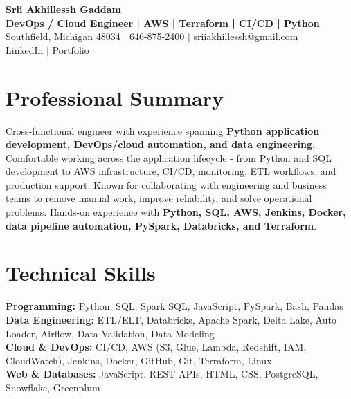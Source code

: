 \documentclass[letterpaper,10pt]{article}
\begin{document}
\fontsize{9.35pt}{10.45pt}\selectfont

\begin{center}
    {\LARGE \textbf{Srii Akhillessh Gaddam}} \\[-1pt]
    \textbf{DevOps / Cloud Engineer | AWS | Terraform | CI/CD | Python} \\[2pt]
    Southfield, Michigan 48034 $|$
    \href{tel:6468752400}{646-875-2400} $|$
    \href{mailto:sriiakhillessh@gmail.com}{sriiakhillessh@gmail.com} \\[1pt]
    \href{https://www.linkedin.com/in/srii-akhiilessh-gaddam-b48668191/}{LinkedIn} $|$
    \href{https://sriiakhillesshg.github.io/portfolio/}{Portfolio}
\end{center}
\vspace{-8pt}

\section{Professional Summary}
\small{Cross-functional engineer with experience spanning \textbf{Python application development, DevOps/cloud automation, and data engineering}. Comfortable working across the application lifecycle - from Python and SQL development to AWS infrastructure, CI/CD, monitoring, ETL workflows, and production support. Known for collaborating with engineering and business teams to remove manual work, improve reliability, and solve operational problems. Hands-on experience with \textbf{Python, SQL, AWS, Jenkins, Docker, data pipeline automation, PySpark, Databricks, and Terraform}.}

\section{Technical Skills}
\small{
\textbf{Programming:} Python, SQL, Spark SQL, JavaScript, PySpark, Bash, Pandas \\
\textbf{Data Engineering:} ETL/ELT, Databricks, Apache Spark, Delta Lake, Auto Loader, Airflow, Data Validation, Data Modeling \\
\textbf{Cloud \& DevOps:} CI/CD, AWS (S3, Glue, Lambda, Redshift, IAM, CloudWatch), Jenkins, Docker, GitHub, Git, Terraform, Linux \\
\textbf{Web \& Databases:} JavaScript, REST APIs, HTML, CSS, PostgreSQL, Snowflake, Greenplum
}
\end{document}
